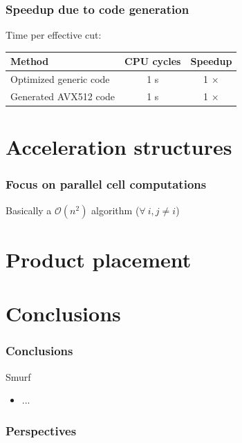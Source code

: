 \documentclass[aspectratio=169]{beamer}
\begin{document}
\begin{frame}
    \frametitle{Speedup due to code generation}

    Time per effective cut:

    \medskip
    \begin{center}    
    \begin{tabular}{|l|c|c|}
        \hline
        Method                 & CPU cycles & Speedup    \\
        \hline
        Optimized generic code & 1 s        & 1 $\times$ \\
        Generated AVX512 code  & 1 s        & 1 $\times$ \\
        \hline
    \end{tabular}
    \end{center}
\end{frame}


%         



\section{Acceleration structures}

\begin{frame}
    \frametitle{Focus on parallel cell computations}

    Basically a $\mathcal{O}( n^2 )$ algorithm ($\forall\ i, j \neq i$)
    
    
\end{frame}


\section{Product placement}


\section{Conclusions}

\begin{frame}
    \frametitle{Conclusions}

    Smurf
    \begin{itemize}
        \item ...
    \end{itemize}
    
    \vfill
\end{frame}


\begin{frame}
    \frametitle{Perspectives}

\end{frame}
\end{document}
